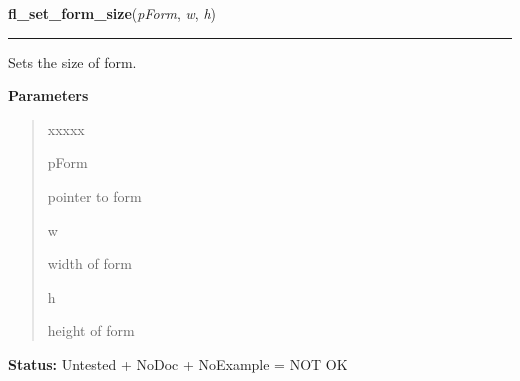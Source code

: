 \hspace{.8\funcindent}\begin{boxedminipage}{\funcwidth}

    \raggedright \textbf{fl\_set\_form\_size}(\textit{pForm}, \textit{w}, \textit{h})

    \vspace{-1.5ex}

    \rule{\textwidth}{0.5\fboxrule}
\setlength{\parskip}{2ex}
    Sets the size of form.

\setlength{\parskip}{1ex}
      \textbf{Parameters}
      \vspace{-1ex}

      \begin{quote}
        \begin{Ventry}{xxxxx}

          \item[pForm]

          pointer to form

          \item[w]

          width of form

          \item[h]

          height of form

        \end{Ventry}

      \end{quote}

\textbf{Status:} Untested + NoDoc + NoExample = NOT OK



    \end{boxedminipage}

    \label{xformslib:library:fl_set_form_hotspot}

    \vspace{0.5ex}

